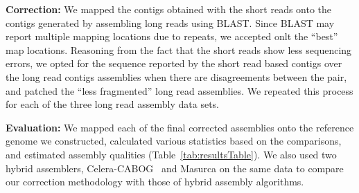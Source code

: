 \documentclass[12pt]{article}
\begin{document}
\textbf{Correction:} We mapped the contigs obtained with the short reads onto the contigs generated by assembling long reads using BLAST\cite{blast}. Since BLAST may report multiple mapping locations due to repeats, we accepted onlt the ``best'' map locations. Reasoning from the fact that the short reads show less sequencing errors, we opted for the sequence reported by the short read based contigs over the long read contigs assemblies when there are disagreements between the pair, and patched the ``less fragmented'' long read assemblies. We repeated this process for each of the three long read assembly data sets.

\textbf{Evaluation:} We mapped each of the final corrected assemblies onto the reference genome we constructed, calculated various statistics based on the comparisons, and estimated assembly qualities (Table~\ref{tab:resultsTable}). We also used  two hybrid assemblers, Celera-CABOG~\cite{cabogMiller:2008} and Masurca \cite{masurcaZimin:2013} on the same data to compare our correction methodology with those of hybrid assembly algorithms.

\end{document}
